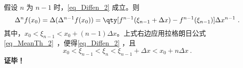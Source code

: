 假设 $n$ 为 $n-1$ 时，\autoref{eq_Diffen_2} 成立。则
\begin{equation}
\Delta^n f(x_0)=\Delta(\Delta^{n-1}f(x_0))=\qty[f^{n-1}(\xi_{n-1}+\Delta x)-f^{n-1}(\xi_{n-1})]\Delta x^{n-1}~.
\end{equation}
其中，$x_0<\xi_{n-1}<x_0+(n-1)\Delta x$。上式右边应用拉格朗日公式\autoref{eq_MeanTh_2}~，便得\autoref{eq_Diffen_2} ，且
\begin{equation}
x_0<\xi_{n-1}<\xi_n<\xi_{n-1}+\Delta x<x_0+n\Delta x~.
\end{equation}
\textbf{证毕！}